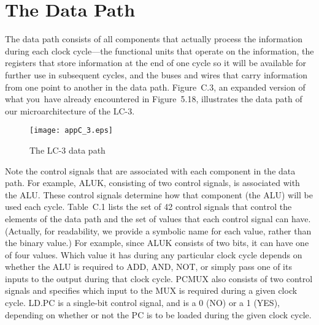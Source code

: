 \documentclass{patt}
\begin{document}
 \bgroup
 \makeatletter
  \makeatother

\section{The Data Path}

The data path consists of all components that actually process the
information during each clock cycle---the functional units that operate on the
information, the registers that store information at the end of one
cycle so it will be available for further use in subsequent cycles,
and the buses and wires that carry information from one point to
another in the data path.  Figure~C.3, an expanded version of what
you~have already encountered in Figure~5.18, illustrates the data path
of our microarchitecture of the LC-3.

\begin{figure}
\hspace*{-8pc}\begin{minipage}{36pc}
\centerline{\texttt{[image: appC\_3.eps]}}
\caption{The LC-3 data path}
\label{fig:datapath}
\end{minipage}
\end{figure}


Note the control signals that are associated with each component in
the data path.  For example, ALUK, consisting of two control signals,
is associated with the ALU.  These control signals determine how that
component (the ALU) will be used each cycle.  Table~C.1 lists the set of 
42 control signals that control the elements of the data path and the set of
values that each control signal can have.  (Actually, for readability,
we provide a symbolic name for each value, rather than the binary value.)
For example, since ALUK consists of two bits, it can have one of four
values.  Which value it has during any particular clock cycle depends
on whether the ALU is required to ADD, AND, NOT, or simply pass one of
its inputs to the output during that clock cycle.  PCMUX also consists
of two control signals and specifies which input to the MUX is
required during a given clock cycle.  LD.PC is a single-bit control
signal, and is a 0 (NO) or a 1 (YES), depending on whether or not the
PC is to be loaded during the given clock cycle.
\end{document}
